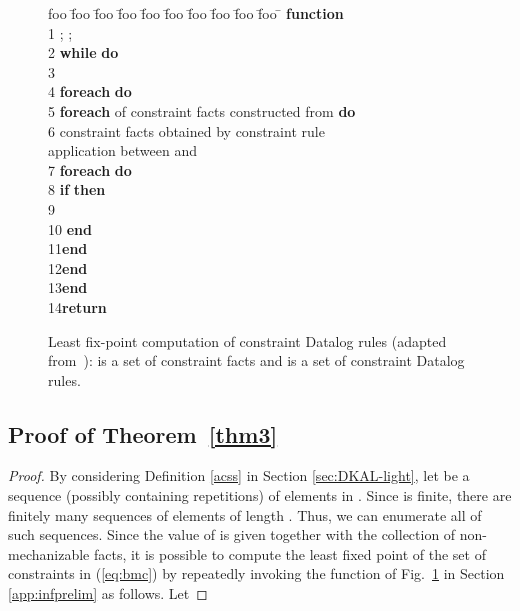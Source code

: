 \documentclass[conference]{llncs}
\begin{document}
{\begin{figure}[t]
\footnotesize
  \centering
    \begin{minipage}{.3\textwidth}
      \begin{tabbing}
        foo \= foo \= foo \= foo \= foo \= foo \= foo \= foo \= foo \= foo \= \kill
        \textbf{function}  \\
        1 \> ;  ; \\ 2\> \textbf{while}  \textbf{do}\\
        3\>\> \\
        4\>\> \textbf{foreach}  \textbf{do} \\ 
        5\>\>\> \textbf{foreach}  of constraint facts constructed from   \textbf{do}\\
        6\>\>\>\>  constraint facts obtained by constraint rule  \\
        \>\>\>\> \hspace{2.05cm} application between  and  \\
        7\>\>\>\> \textbf{foreach}  \textbf{do} \\ 
        8\>\>\>\> \textbf{if}  \textbf{then} \\ 
        9 \>\>\>\> \\
        10\>\>\>\> \textbf{end} \\
        11\>\>\>\textbf{end}\\
        12\>\>\textbf{end}\\
        13\>\textbf{end}\\
        14\>\textbf{return} 
      \end{tabbing}
    \end{minipage}
  \caption{\label{fig:fixpoint-comp}Least fix-point computation of
    constraint Datalog rules (adapted from~\cite{constraintdatalog}):
     is a set of {constraint facts} and  is a set of {constraint
      Datalog rules.}}
\end{figure}


\subsection{Proof of Theorem~\ref{thm3} }
\label{proof}
\begin{proof}
  By considering Definition \ref{acss} in Section \ref{sec:DKAL-light}, let  be a sequence (possibly containing repetitions) of elements in .  Since  is finite, there
  are finitely many sequences of elements of length . 
  Thus, we can enumerate all of such sequences.  
  Since the value of  is given together with the collection  of
  non-mechanizable facts, it is possible to compute the least fixed point of the set
   of constraints in (\ref{eq:bmc}) by repeatedly
  invoking the function  of
  Fig.~\ref{fig:fixpoint-comp} in Section \ref{app:infprelim} as follows.  Let
   

\end{proof}}
\end{document}
